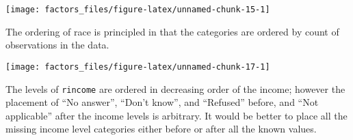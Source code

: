 \documentclass[]{book}
\newenvironment{Shaded}{\begin{snugshade}}{\end{snugshade}}
\newcommand{\CommentTok}[1]{\textcolor[rgb]{0.56,0.35,0.01}{\textit{#1}}}
\newcommand{\DataTypeTok}[1]{\textcolor[rgb]{0.13,0.29,0.53}{#1}}
\newcommand{\KeywordTok}[1]{\textcolor[rgb]{0.13,0.29,0.53}{\textbf{#1}}}
\newcommand{\NormalTok}[1]{#1}
\newcommand{\OperatorTok}[1]{\textcolor[rgb]{0.81,0.36,0.00}{\textbf{#1}}}
\newcommand{\OtherTok}[1]{\textcolor[rgb]{0.56,0.35,0.01}{#1}}
\newcommand{\StringTok}[1]{\textcolor[rgb]{0.31,0.60,0.02}{#1}}
\theoremstyle{plain}
\theoremstyle{remark}
\theoremstyle{definition}
\theoremstyle{definition}
\theoremstyle{definition}
\theoremstyle{remark}
\begin{document}
\begin{Shaded}
\end{Shaded}

\begin{center}\texttt{[image: factors\_files/figure-latex/unnamed-chunk-15-1]} \end{center}

The ordering of race is principled in that the categories are ordered by
count of observations in the data.

\begin{Shaded}
\end{Shaded}

\begin{Shaded}
\end{Shaded}

\begin{center}\texttt{[image: factors\_files/figure-latex/unnamed-chunk-17-1]} \end{center}

The levels of \texttt{rincome} are ordered in decreasing order of the
income; however the placement of ``No answer'', ``Don't know'', and
``Refused'' before, and ``Not applicable'' after the income levels is
arbitrary. It would be better to place all the missing income level
categories either before or after all the known values.

\begin{Shaded}
\end{Shaded}
\end{document}

